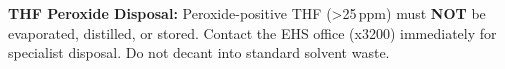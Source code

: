 \vspace{4pt}
\begin{tcolorbox}[infobox]
  \faBell\quad \textbf{THF Peroxide Disposal:} Peroxide-positive THF
  (\textgreater{}25\,ppm) must \textbf{NOT} be evaporated, distilled, or
  stored. Contact the EHS office (x3200) immediately for specialist disposal.
  Do not decant into standard solvent waste.
\end{tcolorbox}
